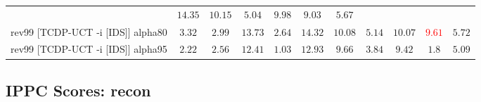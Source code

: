 \documentclass{article}
\begin{document}
\begin{tabular}{|l|r@{$\pm$}rr@{$\pm$}rr@{$\pm$}rr@{$\pm$}rr@{$\pm$}rr@{$\pm$}rr@{$\pm$}rr@{$\pm$}rr@{$\pm$}rr@{$\pm$}r|}
& \multicolumn{2}{c}{\textbf{$14.35$}}
& \multicolumn{2}{c}{\textbf{$10.15$}}
& \multicolumn{2}{c}{\textbf{$5.04$}}
& \multicolumn{2}{c}{\textbf{$9.98$}}
& \multicolumn{2}{c}{$9.03$}
& \multicolumn{2}{c|}{$5.67$}
\\
rev99 [TCDP-UCT -i [IDS]] alpha80
& \multicolumn{2}{c}{$3.32$}
& \multicolumn{2}{c}{$2.99$}
& \multicolumn{2}{c}{\textbf{$13.73$}}
& \multicolumn{2}{c}{$2.64$}
& \multicolumn{2}{c}{\textbf{$14.32$}}
& \multicolumn{2}{c}{\textbf{$10.08$}}
& \multicolumn{2}{c}{\textbf{$5.14$}}
& \multicolumn{2}{c}{\textbf{$10.07$}}
& \multicolumn{2}{c}{\textbf{\textcolor{red}{$9.61$}}}
& \multicolumn{2}{c|}{$5.72$}
\\
rev99 [TCDP-UCT -i [IDS]] alpha95
& \multicolumn{2}{c}{$2.22$}
& \multicolumn{2}{c}{$2.56$}
& \multicolumn{2}{c}{$12.41$}
& \multicolumn{2}{c}{$1.03$}
& \multicolumn{2}{c}{$12.93$}
& \multicolumn{2}{c}{$9.66$}
& \multicolumn{2}{c}{$3.84$}
& \multicolumn{2}{c}{$9.42$}
& \multicolumn{2}{c}{$1.8$}
& \multicolumn{2}{c|}{$5.09$}
\\
\hline
\end{tabular}%

\bigskip

\subsection*{IPPC Scores: recon}
\end{document}
